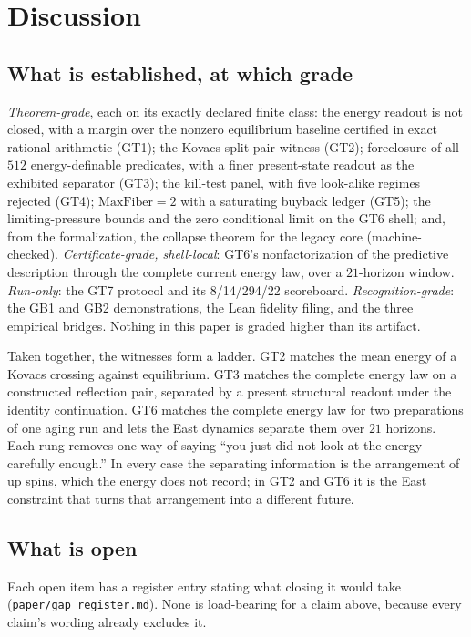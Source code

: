 \section{Discussion}
\label{sec:discussion}

\subsection{What is established, at which grade}

\emph{Theorem-grade}, each on its exactly declared finite class: the energy readout is not closed,
with a margin over the nonzero equilibrium baseline certified in exact rational arithmetic (GT1);
the Kovacs split-pair witness (GT2); foreclosure of all $512$ energy-definable predicates, with a
finer present-state readout as the exhibited separator (GT3); the kill-test panel, with five
look-alike regimes rejected (GT4); $\mathrm{MaxFiber}=2$ with a saturating buyback ledger (GT5);
the limiting-pressure bounds and the zero conditional limit on the GT6 shell; and, from the
formalization, the collapse theorem for the legacy core (machine-checked).
\emph{Certificate-grade, shell-local}: GT6's nonfactorization of the predictive description through
the complete current energy law, over a $21$-horizon window. \emph{Run-only}: the GT7 protocol and
its 8/14/294/22 scoreboard. \emph{Recognition-grade}: the GB1 and GB2 demonstrations, the Lean
fidelity filing, and the three empirical bridges. Nothing in this paper is graded higher than its
artifact.

Taken together, the witnesses form a ladder. GT2 matches the mean energy of a Kovacs crossing
against equilibrium. GT3 matches the complete energy law on a constructed reflection pair,
separated by a present structural readout under the identity continuation. GT6 matches the
complete energy law for two preparations of one aging run and lets the East dynamics separate
them over $21$ horizons. Each rung removes one way of saying ``you just did not look at the energy
carefully enough.'' In every case the separating information is the arrangement of up spins,
which the energy does not record; in GT2 and GT6 it is the East constraint that turns that
arrangement into a different future.

\subsection{What is open}

Each open item has a register entry stating what closing it would take
(\texttt{paper/gap\_register.md}). None is load-bearing for a claim above, because every claim's
wording already excludes it.

